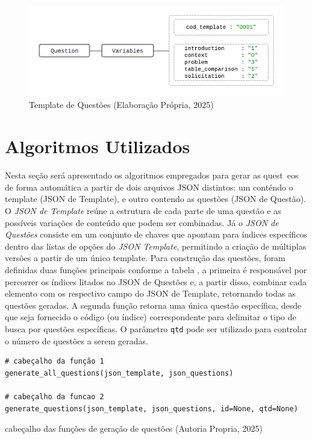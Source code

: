 \begin{figure}[ht]
	\centering
	\includegraphics[width=16cm]{./imagens/capitulo5/template-2}
	\caption{Template de Questões (Elaboração Própria, 2025) }
	\label{fig:template-2}
\end{figure}

\section{Algoritmos Utilizados}

Nesta seção será apresentado os algoritmos empregados para gerar as quest~eos de forma automática a partir de dois arquivos JSON distintos: um conténdo o template (JSON de Template), e outro contendo as questões (JSON de Questão). O \textit{JSON de Template} reúne a estrutura de cada parte de uma questão e as possíveis variações de conteúdo que podem ser combinadas. Já o \textit{JSON de Questões} consiste em um conjunto de chaves que apontam para índices específicos dentro das listas de opções do \textit{JSON Template}, permitindo a criação de múltiplas versões a partir de um único template. 
Para construção das questões, foram definidas duas funções principais conforme a tabela , a primeira é responsável por percorrer os índices litados no JSON de Questões e, a partir disso, combinar cada elemento com os respectivo campo do JSON de Template, retornando todas as questões geradas. A segunda função retorna uma única questão específica, desde que seja fornecido o código (ou índice) correspondente para delimitar o tipo de busca por questões específicas. O parâmetro \verb|qtd| pode ser utilizado para controlar o número de questões a serem geradas. 


\begin{listing}[ht]
\begin{verbatim}
# cabeçalho da função 1
generate_all_questions(json_template, json_questions)

# cabeçalho da funcao 2
generate_questions(json_template, json_questions, id=None, qtd=None) 
\end{verbatim}
\caption{cabeçalho das funções de geração de questões (Autoria Propria, 2025)}
\label{cod:primo}
\end{listing}

